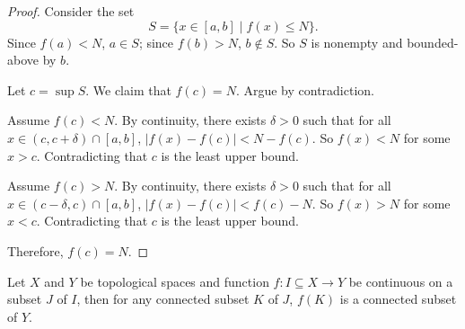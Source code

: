 \documentclass[a4paper,12pt]{report}
\begin{document}
\begin{itemize}
\begin{itemize}
\begin{proof}
Consider the set
\[S=\{x\in [a,b]\mid f(x)\leq N\}.\]
Since $f(a)<N$, $a\in S$; since $f(b)>N$, $b\notin S$. So $S$ is nonempty and bounded-above by $b$.

Let $c=\sup S$. We claim that $f(c)=N$. Argue by contradiction.

Assume $f(c)<N$. By continuity, there exists $\delta>0$ such that for all $x\in (c,c+\delta)\cap [a,b]$, $|f(x)-f(c)|<N-f(c)$. So $f(x)<N$ for some $x>c$. Contradicting that $c$ is the least upper bound.

Assume $f(c)>N$. By continuity, there exists $\delta>0$ such that for all $x\in (c-\delta,c)\cap [a,b]$, $|f(x)-f(c)|<f(c)-N$. So $f(x)>N$ for some $x<c$. Contradicting that $c$ is the least upper bound.

Therefore, $f(c)=N$.
\end{proof}
Let $X$ and $Y$ be topological spaces and function $f\colon I\subseteq X\to Y$ be continuous on a subset $J$ of $I$, then for any connected subset $K$ of $J$, $f(K)$ is a connected subset of $Y$.


\end{itemize}
\end{itemize}
\end{document}
